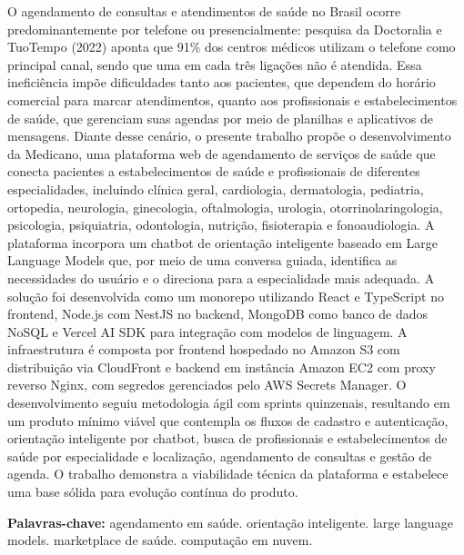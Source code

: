 \begin{resumo}
  O agendamento de consultas e atendimentos de saúde no Brasil
  ocorre predominantemente por telefone ou presencialmente:
  pesquisa da Doctoralia e TuoTempo (2022) aponta que 91\% dos
  centros médicos utilizam o telefone como principal canal,
  sendo que uma em cada três ligações não é atendida. Essa
  ineficiência impõe dificuldades tanto aos pacientes, que
  dependem do horário comercial para marcar atendimentos,
  quanto aos profissionais e estabelecimentos de saúde, que gerenciam
  suas agendas por meio de planilhas e aplicativos de mensagens.
  Diante desse cenário, o presente trabalho propõe o
  desenvolvimento da Medicano, uma plataforma web de agendamento
  de serviços de saúde que conecta pacientes a estabelecimentos de saúde e
  profissionais de diferentes especialidades, incluindo clínica geral,
  cardiologia, dermatologia, pediatria, ortopedia, neurologia,
  ginecologia, oftalmologia, urologia, otorrinolaringologia,
  psicologia, psiquiatria, odontologia, nutrição, fisioterapia e
  fonoaudiologia. A plataforma
  incorpora um chatbot de orientação inteligente baseado em Large
  Language Models que, por meio de uma conversa guiada, identifica
  as necessidades do usuário e o direciona para a especialidade
  mais adequada. A solução foi desenvolvida como um monorepo
  utilizando React e TypeScript no frontend, Node.js com NestJS
  no backend, MongoDB como banco de dados NoSQL e Vercel AI SDK
  para integração com modelos de linguagem. A infraestrutura é
  composta por frontend hospedado no Amazon S3 com distribuição
  via CloudFront e backend em instância Amazon EC2 com proxy
  reverso Nginx, com segredos gerenciados pelo AWS Secrets
  Manager. O desenvolvimento seguiu metodologia ágil com sprints
  quinzenais, resultando em um produto mínimo viável que
  contempla os fluxos de cadastro e autenticação, orientação
  inteligente por chatbot, busca de profissionais e estabelecimentos de saúde
  por especialidade e localização, agendamento de consultas e
  gestão de agenda. O trabalho demonstra a viabilidade técnica
  da plataforma e estabelece uma base sólida para evolução
  contínua do produto.

  \vspace{\onelineskip}
  \noindent\textbf{Palavras-chave:}
  agendamento em saúde. orientação inteligente. large language
  models. marketplace de saúde. computação em nuvem.
\end{resumo}